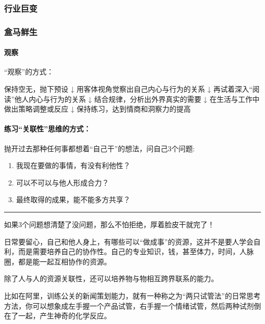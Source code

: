 \documentclass[letterpaper,10pt,english]{sphinxmanual}
\begin{document}
\subsubsection{行业巨变}
\label{\detokenize{chapter_experience/issue:id1}}\label{\detokenize{chapter_experience/issue::doc}}

\subsubsection{盒马鲜生}
\label{\detokenize{chapter_experience/hema:id1}}\label{\detokenize{chapter_experience/hema::doc}}

\paragraph{观察}
\label{\detokenize{chapter_experience/hema:id2}}
“观察”的方式：

保持空无，抛下预设 ↓ 用客体视角觉察出自己内心与行为的关系 ↓
再试着深入“阅读”他人内心与行为的关系 ↓ 结合规律，分析出外界真实的需要 ↓
在生活与工作中做出策略调整或反应 ↓ 保持练习，达到情商和洞察力的提高


\paragraph{练习“关联性”思维的方式：}
\label{\detokenize{chapter_experience/hema:id3}}
抛开过去那种任何事都想着“自己干”的想法，问自己3个问题:
\begin{enumerate}
%
\item {} 
我现在要做的事情，有没有利他性？

\item {} 
可以不可以与他人形成合力？

\item {} 
最终取得的成果，能不能多方共享？

\end{enumerate}


\bigskip\hrule\bigskip


如果3个问题想清楚了没问题，那么不怕拒绝，厚着脸皮干就完了！

日常要留心，自己和他人身上，有哪些可以“做成事”的资源，这并不是要人学会自利，而是需要培养自己的协作性。自己的专业知识，钱，甚至体力，时间，人脉圈，都是能一起互相协作的资源。

除了人与人的资源关联性，还可以培养物与物相互跨界联系的能力。

比如在阿里，训练公关的新闻策划能力，就有一种称之为“两只试管法”的日常思考方法，你可以想象成左手握一个产品试管，右手握一个情绪试管，然后两种试剂倒在了一起，产生神奇的化学反应。
\end{document}
